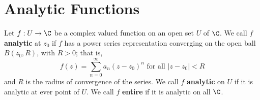 \section{Analytic Functions}

\begin{definition}
    Let $f:U \xrightarrow{} \C$ be a complex valued function on an open set $U$
    of  $\C$. We call $f$ \textbf{analytic} at $z_0$ if $f$ has a power series
    representation converging on the open ball  $B(z_0,R)$, with $R>0$; that is,
    \begin{equation*}
        f(z)=\sum_{n=0}^\infty{a_n(z-z_0)^n} \text{ for all } |z-z_0|<R
    \end{equation*}
    and $R$ is the radius of convergence of the series. We call $f$
    \textbf{analytic} on $U$ if it is analytic at ever point of  $U$. We call
    $f$  \textbf{entire} if it is analytic on all $\C$.
\end{definition}


